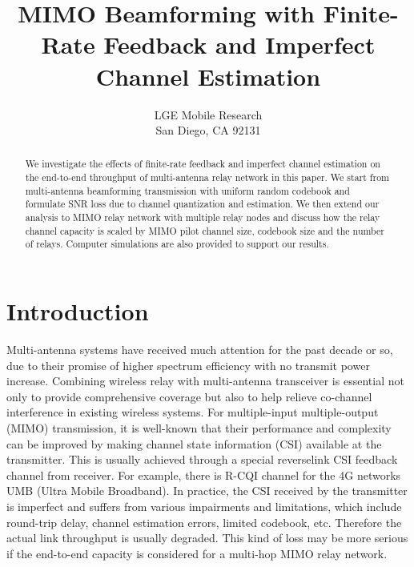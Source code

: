 \documentclass[10pt,fleqn, twocolumn]{IEEEtran}
\title{MIMO Beamforming with Finite-Rate Feedback and Imperfect Channel Estimation}
\author{LGE Mobile Research\\San Diego, CA 92131}
\date{}
\begin{document}
\maketitle
\begin{abstract}\small
We investigate the effects of finite-rate feedback and imperfect
channel estimation on the end-to-end throughput of multi-antenna
relay network in this paper. We start from multi-antenna
beamforming transmission with uniform random codebook and
formulate SNR loss due to channel quantization and estimation. We
then extend our analysis to MIMO relay network with multiple relay
nodes and discuss how the relay channel capacity is scaled by MIMO
pilot channel size, codebook size and the number of relays.
Computer simulations are also provided to support our results.
\end{abstract}

\section{Introduction}
Multi-antenna systems have received much attention for the past
decade or so, due to their promise of higher spectrum efficiency
with no transmit power increase. Combining wireless relay with
multi-antenna transceiver is essential not only to provide
comprehensive coverage but also to help relieve co-channel
interference in existing wireless systems. For multiple-input
multiple-output (MIMO) transmission, it is well-known that their
performance and complexity can be improved by making channel state
information (CSI) available at the transmitter. This is usually
achieved through a special reverselink CSI feedback channel from
receiver. For example, there is R-CQI channel for the 4G networks
UMB (Ultra Mobile Broadband). In practice, the CSI received by the
transmitter is imperfect and suffers from various impairments and
limitations, which include round-trip delay, channel estimation
errors, limited codebook, etc. Therefore the actual link
throughput is usually degraded. This kind of loss may be more
serious if the end-to-end capacity is considered for a multi-hop
MIMO relay network.
\end{document}
